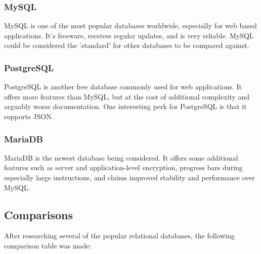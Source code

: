 \documentclass[onecolumn, draftclsnofoot, 10pt, compsoc]{IEEEtran}
\begin{document}
\subsubsection{MySQL}
MySQL is one of the most popular databases worldwide, especially for web based applications.  It's freeware, receives regular updates, and is very reliable.  MySQL could be considered the 'standard' for other databases to be compared against.\cite{6}

\subsubsection{PostgreSQL}
PostgreSQL is another free database commonly used for web applications.  It offers more features than MySQL, but at the cost of additional complexity and arguably worse documentation.  One interesting perk for PostgreSQL is that it supports JSON.\cite{5}

\subsubsection{MariaDB}
MariaDB is the newest database being considered.  It offers some additional features such as server and application-level encryption, progress bars during especially large instructions, and claims improved stability and performance over MySQL.\cite{7}

\subsection{Comparisons}
After researching several of the popular relational databases, the following comparison table was made\cite{5}\cite{6}\cite{7}:
\end{document}
